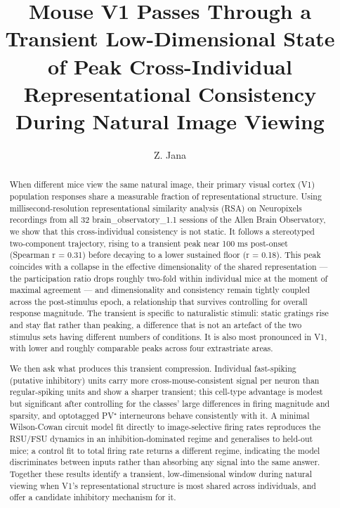\documentclass[11pt,onecolumn]{article}
\title{\textbf{Mouse V1 Passes Through a Transient Low-Dimensional State
of Peak Cross-Individual Representational Consistency During Natural
Image Viewing}}
\author[1]{Z. Jana\orcidlink{0009-0009-3316-7476}}
\affil[1]{Department of Computer Science and Engineering,
The American University in Cairo}
\date{}
\begin{document}
\maketitle

\begin{abstract}
When different mice view the same natural image, their primary visual cortex (V1) population 
responses share a measurable fraction of representational structure. Using 
millisecond-resolution representational similarity analysis (RSA) on Neuropixels recordings 
from all 32 brain_observatory_1.1 sessions of the Allen Brain Observatory, we show that this 
cross-individual consistency is not static. It follows a stereotyped two-component trajectory, 
rising to a transient peak near 100 ms post-onset (Spearman r = 0.31) before decaying to a 
lower sustained floor (r = 0.18). This peak coincides with a collapse in the effective 
dimensionality of the shared representation — the participation ratio drops roughly 
two-fold within individual mice at the moment of maximal agreement — and dimensionality 
and consistency remain tightly coupled across the post-stimulus epoch, a relationship 
that survives controlling for overall response magnitude. The transient is specific to 
naturalistic stimuli: static gratings rise and stay flat rather than peaking, a difference 
that is not an artefact of the two stimulus sets having different numbers of conditions. 
It is also most pronounced in V1, with lower and roughly comparable peaks across four 
extrastriate areas.

We then ask what produces this transient compression. Individual fast-spiking (putative 
inhibitory) units carry more cross-mouse-consistent signal per neuron than regular-spiking 
units and show a sharper transient; this cell-type advantage is modest but significant 
after controlling for the classes' large differences in firing magnitude and sparsity, 
and optotagged PV⁺ interneurons behave consistently with it. A minimal Wilson-Cowan circuit 
model fit directly to image-selective firing rates reproduces the RSU/FSU dynamics in an 
inhibition-dominated regime and generalises to held-out mice; a control fit to total firing 
rate returns a different regime, indicating the model discriminates between inputs rather 
than absorbing any signal into the same answer. Together these results identify a transient, 
low-dimensional window during natural viewing when V1's representational structure is most 
shared across individuals, and offer a candidate inhibitory mechanism for it.

\end{abstract}
\end{document}
